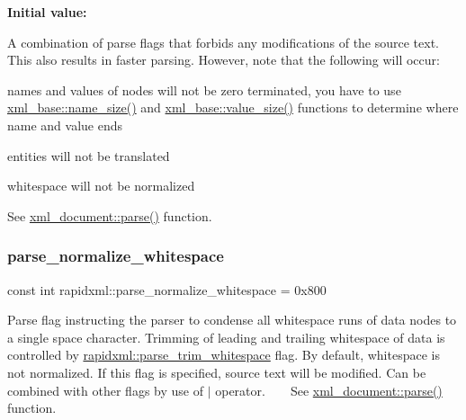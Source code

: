 {\bfseries Initial value\+:}
\begin{DoxyCode}{0}
\DoxyCodeLine{=}

\end{DoxyCode}
A combination of parse flags that forbids any modifications of the source text. This also results in faster parsing. However, note that the following will occur\+: 
\begin{DoxyItemize}
\item names and values of nodes will not be zero terminated, you have to use \mbox{\hyperlink{classrapidxml_1_1xml__base_a20c8ffbe0c7a0b4231681ab8b99330a4}{xml\+\_\+base\+::name\+\_\+size()}} and \mbox{\hyperlink{classrapidxml_1_1xml__base_a2eb123d471b1567fa4832b6ee2b75493}{xml\+\_\+base\+::value\+\_\+size()}} functions to determine where name and value ends 
\item entities will not be translated 
\item whitespace will not be normalized 
\end{DoxyItemize}See \mbox{\hyperlink{classrapidxml_1_1xml__document_ac6e73ff9ac323bf5a370c38feb03a6b1}{xml\+\_\+document\+::parse()}} function. \mbox{\label{namespacerapidxml_a31f33885defb5176a7d99e524c35d386}} 
\subsubsection{\texorpdfstring{parse\_normalize\_whitespace}{parse\_normalize\_whitespace}}
{\footnotesize\ttfamily const int rapidxml\+::parse\+\_\+normalize\+\_\+whitespace = 0x800}

Parse flag instructing the parser to condense all whitespace runs of data nodes to a single space character. Trimming of leading and trailing whitespace of data is controlled by \mbox{\hyperlink{namespacerapidxml_a61912424b47db5038e726d4e1c22417f}{rapidxml\+::parse\+\_\+trim\+\_\+whitespace}} flag. By default, whitespace is not normalized. If this flag is specified, source text will be modified. Can be combined with other flags by use of $\vert$ operator. ~\newline
~\newline
 See \mbox{\hyperlink{classrapidxml_1_1xml__document_ac6e73ff9ac323bf5a370c38feb03a6b1}{xml\+\_\+document\+::parse()}} function. \mbox{\label{namespacerapidxml_a03fe68fcf5d28f38476e0fd31adecc4c}} 
